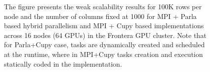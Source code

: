 \documentclass{article}
\begin{document}
\begin{figure}[H]
    \caption{The figure presents the weak scalability results for 100K rows per node and the number of columns fixed at 1000 for MPI + Parla based hybrid parallelism and MPI + Cupy based implementations across 16 nodes (64 GPUs) in the Frontera GPU cluster. Note that for Parla+Cupy case, tasks are dynamically created and scheduled at the runtime, where in MPI+Cupy tasks creation and execution statically coded in the implementation.\label{fig:parla_ws_n1000} }
\end{figure}
\end{document}
